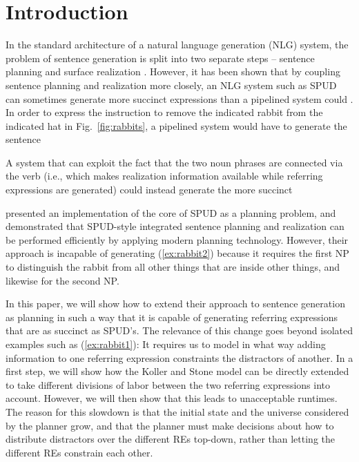 \section{Introduction}
\label{sec:introduction}

In the standard architecture of a natural language generation (NLG)
system, the problem of sentence generation is split into two separate
steps -- sentence planning and surface realization
\cite{reiter00building}.  However, it has been shown that by coupling
sentence planning and realization more closely, an NLG system such as
SPUD \cite{Stone2003a} can sometimes generate more succinct
expressions than a pipelined system could \cite{Stone1998a}.  In order
to express the instruction to remove the indicated rabbit from the
indicated hat in Fig.~\ref{fig:rabbits}, a pipelined system would have
to generate the sentence 


  A system that can exploit the fact that the
two noun phrases are connected via the verb (i.e., which makes
realization information available while referring expressions are
generated) could instead generate the more succinct


 presented an implementation of the core of SPUD as
a planning problem, and demonstrated that SPUD-style integrated
sentence planning and realization can be performed efficiently by
applying modern planning technology.  However, their approach is
incapable of generating (\ref{ex:rabbit2}) because it requires the
first NP to distinguish the rabbit from all other things that are
inside other things, and likewise for the second NP.

In this paper, we will show how to extend their approach to sentence
generation as planning in such a way that it is capable of generating
referring expressions that are as succinct as SPUD's.  The relevance
of this change goes beyond isolated examples such as
(\ref{ex:rabbit1}): It requires us to model in what way adding
information to one referring expression constraints the distractors of
another.  In a first step, we will show how the Koller and Stone model
can be directly extended to take different divisions of labor between
the two referring expressions into account.  However, we will then
show that this leads to unacceptable runtimes.  The reason for this
slowdown is that the initial state and the universe considered by the
planner grow, and that the planner must make decisions about how to
distribute distractors over the different REs top-down, rather than
letting the different REs constrain each other.


